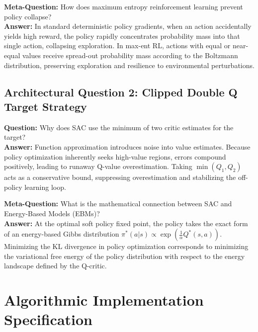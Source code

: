 \documentclass[11pt,a4paper]{article}
\theoremstyle{definition}
\begin{document}
\textbf{Meta-Question:} How does maximum entropy reinforcement learning prevent policy collapse?\\
\textbf{Answer:} In standard deterministic policy gradients, when an action accidentally yields high reward, the policy rapidly concentrates probability mass into that single action, collapsing exploration. In max-ent RL, actions with equal or near-equal values receive spread-out probability mass according to the Boltzmann distribution, preserving exploration and resilience to environmental perturbations.

\subsection{Architectural Question 2: Clipped Double Q Target Strategy}
\textbf{Question:} Why does SAC use the minimum of two critic estimates for the target?\\
\textbf{Answer:} Function approximation introduces noise into value estimates. Because policy optimization inherently seeks high-value regions, errors compound positively, leading to runaway Q-value overestimation. Taking $\min(Q_1, Q_2)$ acts as a conservative bound, suppressing overestimation and stabilizing the off-policy learning loop.

\textbf{Meta-Question:} What is the mathematical connection between SAC and Energy-Based Models (EBMs)?\\
\textbf{Answer:} At the optimal soft policy fixed point, the policy takes the exact form of an energy-based Gibbs distribution $\pi^*(a | s) \propto \exp\left(\frac{1}{\alpha} Q^*(s, a)\right)$. Minimizing the KL divergence in policy optimization corresponds to minimizing the variational free energy of the policy distribution with respect to the energy landscape defined by the Q-critic.

\section{Algorithmic Implementation Specification}
\end{document}

